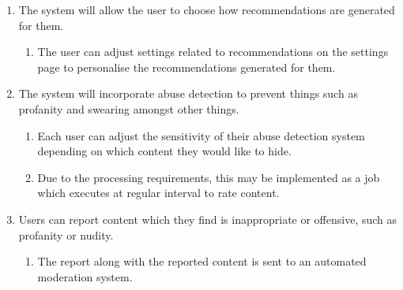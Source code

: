 \begin{enumerate}[label=\textbf{F\arabic*}]
\begin{enumerate}
	\end{enumerate}
	\item The system will allow the user to choose how recommendations are generated for them.
	\begin{enumerate}
		\item The user can adjust settings related to recommendations on the settings page to personalise the recommendations generated for them.
	\end{enumerate}
	\item The system will incorporate abuse detection to prevent things such as profanity and swearing amongst other things.
		\begin{enumerate}
			\item Each user can adjust the sensitivity of their abuse detection system depending on which content they would like to hide.
			\item Due to the processing requirements, this may be implemented as a job which executes at regular interval to rate content.
		\end{enumerate}
	\item Users can report content which they find is inappropriate or offensive, such as profanity or nudity.
		\begin{enumerate}
			\item The report along with the reported content is sent to an automated moderation system.
		\end{enumerate}
\end{enumerate}

